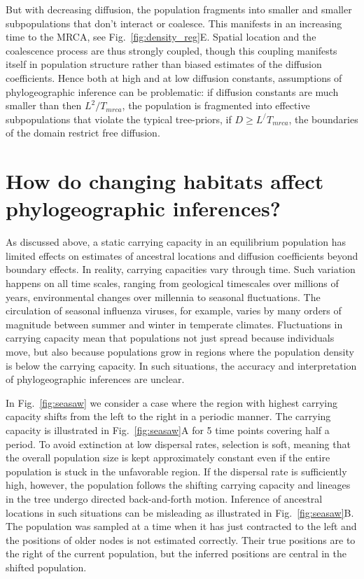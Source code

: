 \documentclass[aps,rmp, twocolumn]{revtex4}
\begin{document}
But with decreasing diffusion, the population fragments into smaller and smaller subpopulations that don't interact or coalesce.
This manifests in an increasing time to the MRCA, see Fig.~\ref{fig:density_reg}E.
Spatial location and the coalescence process are thus strongly coupled, though this coupling manifests itself in population structure rather than biased estimates of the diffusion coefficients.
Hence both at high and at low diffusion constants, assumptions of phylogeographic inference can be problematic: if diffusion constants are much smaller than then $L^2/T_{mrca}$, the population is fragmented into effective subpopulations that violate the typical tree-priors, if $D\geq L^/T_{mrca}$, the boundaries of the domain restrict free diffusion.

\section*{How do changing habitats affect phylogeographic inferences?}
As discussed above, a static carrying capacity in an equilibrium population has limited effects on estimates of ancestral locations and diffusion coefficients beyond boundary effects.
In reality, carrying capacities vary through time.
Such variation happens on all time scales, ranging from geological timescales over millions of years, environmental changes over millennia to seasonal fluctuations.
The circulation of seasonal influenza viruses, for example, varies by many orders of magnitude between summer and winter in temperate climates.
Fluctuations in carrying capacity mean that populations not just spread because individuals move, but also because populations grow in regions where the population density is below the carrying capacity.
In such situations, the accuracy and interpretation of phylogeographic inferences are unclear.

In Fig.~\ref{fig:seasaw} we consider a case where the region with highest carrying capacity shifts from the left to the right in a periodic manner.
The carrying capacity is illustrated in Fig.~\ref{fig:seasaw}A for 5 time points covering half a period.
To avoid extinction at low dispersal rates, selection is soft, meaning that the overall population size is kept approximately constant even if the entire population is stuck in the unfavorable region.
If the dispersal rate is sufficiently high, however, the population follows the shifting carrying capacity and lineages in the tree undergo directed back-and-forth motion.
Inference of ancestral locations in such situations can be misleading as illustrated in Fig.~\ref{fig:seasaw}B.
The population was sampled at a time when it has just contracted to the left and the positions of older nodes is not estimated correctly.
Their true positions are to the right of the current population, but the inferred positions are central in the shifted population.
\end{document}
